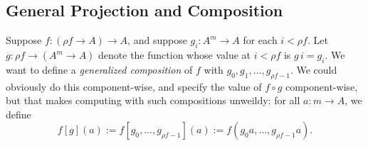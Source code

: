 \documentclass[11pt]{amsart}  %
\begin{document}
\ifextver


\subsection{General Projection and Composition}
Suppose $f \colon (\rho f \to A) \to A$, and suppose 
$g_i \colon A^m \to A$ for each $i <\rho f$.
Let $g \colon \rho f \to (A^m \to A)$ denote
the function whose value at $i < \rho f$ is 
$g\, i = g_i$. We want to define a \emph{generalized composition} of $f$ 
with $g_0, g_1, \dots, g_{\rho f -1}$.  We could obviously do this component-wise,
and specify the value of $f \circ g$ component-wise,
but that makes computing with such compositions unweildy: for all $a : m \to A$, we define
\[
  f [g](a) := f[g_0, \dots, g_{\rho f -1}](a) := f (g_0 a, \dots, g_{\rho f-1} a).
  \]
\end{document}
